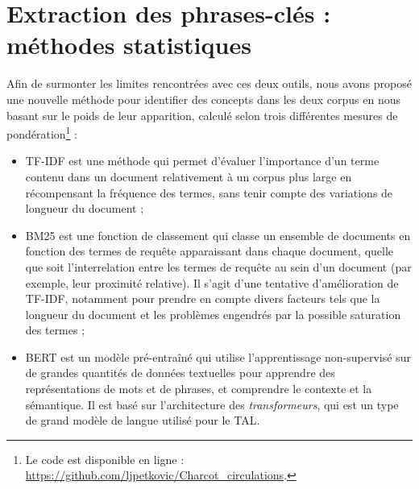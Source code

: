 











\section{Extraction des phrases-clés : méthodes statistiques}
\label{methodo_stat}
Afin de surmonter les limites rencontrées avec ces deux outils, nous avons proposé une nouvelle méthode pour identifier des concepts dans les deux corpus en nous basant sur le poids de leur apparition, calculé selon trois différentes mesures de pondération\footnote{Le code est disponible en ligne : \url{https://github.com/ljpetkovic/Charcot\_circulations}.} :
\begin{itemize}
\item \textsc{TF-IDF} \citep{robertson1976relevance} est une méthode qui permet d'évaluer l'importance d'un terme contenu dans un document relativement à un corpus plus large en récompensant la fréquence des termes, sans tenir compte des variations de longueur du document ;
\item \textsc{BM25} est une fonction de classement qui classe un ensemble de documents en fonction des termes de requête apparaissant dans chaque document, quelle que soit l'interrelation entre les termes de requête au sein d'un document (par exemple, leur proximité relative). Il s'agit d'une tentative d'amélioration de \textsc{TF-IDF}, notamment pour prendre en compte divers facteurs tels que la longueur du document et les problèmes engendrés par la possible saturation des termes \citep[p.~355]{robertson2009probabilistic} ;
\item \textsc{BERT} \citep{devlin2019} est un modèle pré-entraîné qui utilise l'apprentissage non-supervisé sur de grandes quantités de données textuelles pour apprendre des représentations de mots et de phrases, et comprendre le contexte et la sémantique. Il est basé sur l'architecture des \textit{transformeurs}, qui est un type de grand modèle de langue utilisé pour le \textsc{TAL}.
\end{itemize}

